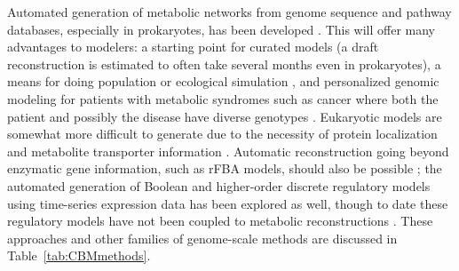 \documentclass[phd,tocprelim]{cornell}
\begin{document}
Automated generation of metabolic networks from genome sequence and
pathway databases, especially in prokaryotes, has been developed
\citep{Seaver2012, Aziz2012, Henry2011, Faria2013}.  This will offer
many advantages to modelers: a starting point for curated models (a
draft reconstruction is estimated to often take several months even in
prokaryotes), a means for doing population or ecological simulation
\citep{Klitgord2011}, and personalized genomic modeling for patients
with metabolic syndromes such as cancer where both the patient and
possibly the disease have diverse genotypes \citep{Locasale2012,
Folger2011}.  Eukaryotic models are somewhat more difficult to
generate due to the necessity of protein localization and metabolite
transporter information \citep{Seaver2012}. Automatic reconstruction
going beyond enzymatic gene information, such as rFBA models, should
also be possible \citep{Covert2001, Herrgard2006c}; the automated
generation of Boolean and higher-order discrete regulatory models
using time-series expression data has been explored as well, though to
date these regulatory models have not been coupled to metabolic
reconstructions \citep{Dingel2009, Dimitrova2009, Stigler2007a,
Jarrah2007}. These approaches and other families of genome-scale
methods are discussed in Table~\ref{tab:CBMmethods}.
\end{document}
